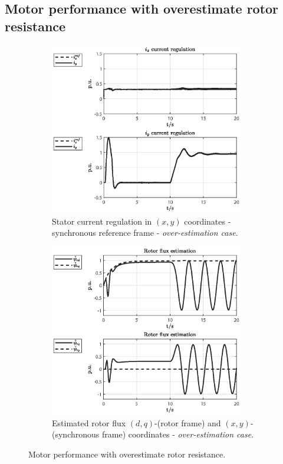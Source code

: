 \documentclass[11pt,a4paper,oneside]{book}
\numberwithin{equation}{section}
\theoremstyle{it}
\theoremstyle{definition}
\begin{document}
\subsection{Motor performance with overestimate rotor resistance}

\begin{figure}[H]
	\centering
	\begin{subfigure}{0.5\textwidth}
	\centering
	\includegraphics[width = 240pt, keepaspectratio]{figures/over_est/current_reg.eps}
	\captionsetup{width=0.65\textwidth, font=footnotesize}		
	\caption{Stator current regulation in $(x,y)$ coordinates - synchronous reference frame - \textit{over-estimation case}.}
	\label{fig_sim_res_9}
	\end{subfigure}%
	\begin{subfigure}{0.5\textwidth}
	\centering
	\includegraphics[width = 240pt, keepaspectratio]{figures/over_est/rotor_flux_est_1.eps}
	\captionsetup{width=0.65\textwidth, font=footnotesize}		
	\caption{Estimated rotor flux $(d,q)$-(rotor frame) and $(x,y)$-(synchronous frame) coordinates - \textit{over-estimation case}.}
	\label{fig_sim_res_10}
	\end{subfigure}		
	\captionsetup{width=0.5\textwidth, font=small}		
	\caption{Motor performance with overestimate rotor resistance.}
	\label{}
\end{figure}
\end{document}
